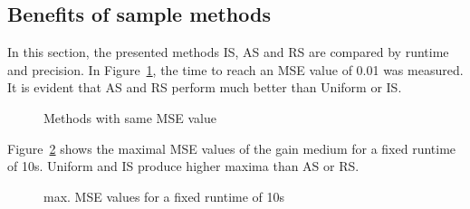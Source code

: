 \subsection{Benefits of sample methods}
In this section, the presented methods IS, AS and RS are compared by runtime
and precision.
In Figure~\ref{graphic:methods_compare}, the time to reach an
MSE value of 0.01 was measured. It is evident that AS and RS perform
much better than Uniform or IS. 
\begin{figure}[H]
  \centerline{
    }
  \caption{Methods with same MSE value}
  \label{graphic:methods_compare}
\end{figure}
Figure~\ref{graphic:methods_compare2} shows the maximal MSE values
of the gain medium for a fixed runtime of 10s. Uniform and IS 
produce higher maxima than AS or RS.
\begin{figure}[H]
  \centerline{
    }
  \caption{max. MSE values for a fixed runtime of 10s}
  \label{graphic:methods_compare2}
\end{figure}
